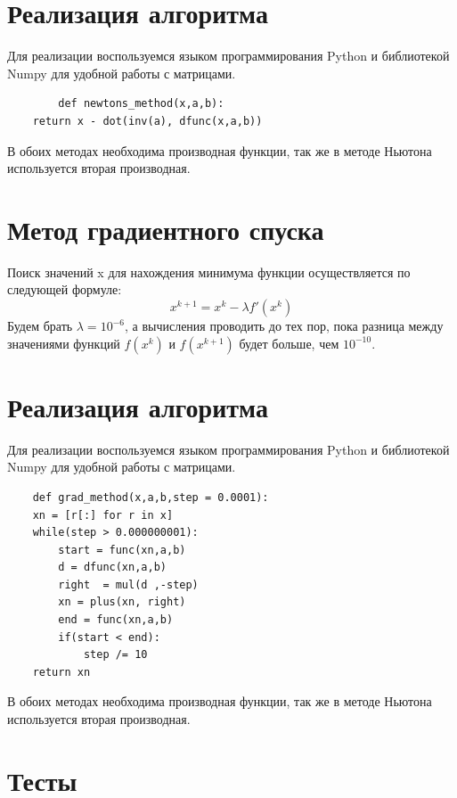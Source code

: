 \documentclass[14pt, titlepage,fleqn]{extarticle}
\begin{document}
	\section*{Реализация алгоритма}
	Для реализации воспользуемся языком программирования Python и библиотекой Numpy для удобной работы с матрицами.
	\begin{lstlisting}
		def newtons_method(x,a,b):
	return x - dot(inv(a), dfunc(x,a,b))
	\end{lstlisting}
	В обоих методах необходима производная функции, так же в методе Ньютона используется вторая производная.
	

	
	\section*{Метод градиентного спуска}
	Поиск значений x для нахождения минимума функции осуществляется по следующей формуле:
	\[x^{k+1} = x^k - \lambda f'(x^k)\]
	Будем брать $\lambda = 10^{-6}$, а вычисления проводить до тех пор, пока разница между значениями функций $f(x^k)$ и $f(x^{k+1})$ будет больше, чем $10^{-10}$.


	\section*{Реализация алгоритма}
	Для реализации воспользуемся языком программирования Python и библиотекой Numpy для удобной работы с матрицами.
	\begin{lstlisting}
	def grad_method(x,a,b,step = 0.0001):
	xn = [r[:] for r in x]
	while(step > 0.000000001):
		start = func(xn,a,b)
		d = dfunc(xn,a,b)
		right  = mul(d ,-step)
		xn = plus(xn, right)
		end = func(xn,a,b)
		if(start < end):
			step /= 10
	return xn

	\end{lstlisting}

	В обоих методах необходима производная функции, так же в методе Ньютона используется вторая производная.
	



	\newpage
	\section*{Тесты}
	\begin{figure}[H]
	\end{figure}
\end{document}
